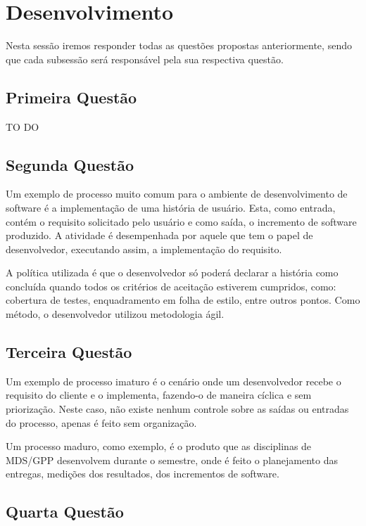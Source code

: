 \chapter[Desenvolvimento ]{Desenvolvimento}

Nesta sessão iremos responder todas as questões propostas anteriormente, sendo
que cada subsessão será responsável pela sua respectiva questão.

\section{Primeira Questão}
\label{sec:Primeira Questão}

TO DO

\section{Segunda Questão}
\label{sec:Segunda Questão}

Um exemplo de processo muito comum para o ambiente de desenvolvimento de software
é a implementação de uma história de usuário. Esta, como entrada, contém o
requisito solicitado pelo usuário e como saída, o incremento de software produzido.
A atividade é desempenhada por aquele que tem o papel de desenvolvedor, executando
assim, a implementação do requisito.

A política utilizada é que o desenvolvedor só poderá declarar a história como
concluída quando todos os critérios de aceitação estiverem cumpridos, como:
cobertura de testes, enquadramento em folha de estilo, entre outros pontos. Como
método, o desenvolvedor utilizou metodologia ágil.

\section{Terceira Questão}
\label{sec:Terceira Questão}

Um exemplo de processo imaturo é o cenário onde um desenvolvedor recebe o requisito
do cliente e o implementa, fazendo-o de maneira cíclica e sem priorização.
Neste caso, não existe nenhum controle sobre as saídas ou entradas do processo,
apenas é feito sem organização.

Um processo maduro, como exemplo, é o produto que as disciplinas de MDS/GPP
desenvolvem durante o semestre, onde é feito o planejamento das entregas, medições
dos resultados, dos incrementos de software.

\section{Quarta Questão}
\label{sec:Quarta Questão}


